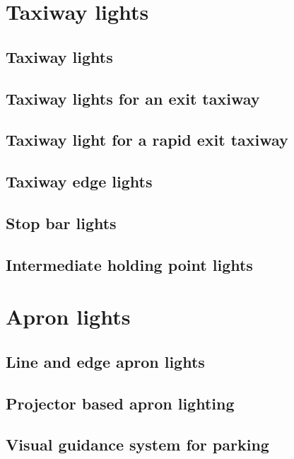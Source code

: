 	\section{Taxiway lights}
		\subsection{Taxiway lights}
		\subsection{Taxiway lights for an exit taxiway}
		\subsection{Taxiway light for a rapid exit taxiway}
		\subsection{Taxiway edge lights}
		\subsection{Stop bar lights}
		\subsection{Intermediate holding point lights}
	
	\section{Apron lights}
		\subsection{Line and edge apron lights}
		\subsection{Projector based apron lighting}
		\subsection{Visual guidance system for parking}
		
		
		

